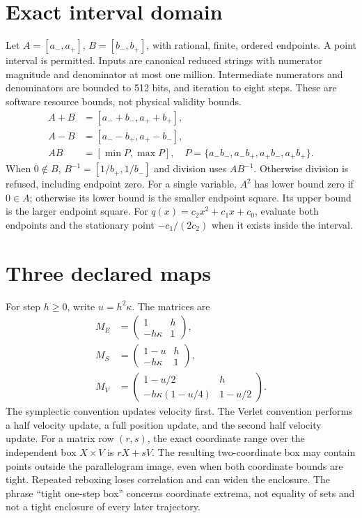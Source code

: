\documentclass[11pt]{article}
\begin{document}
\section{Exact interval domain}
Let \(A=[a_-,a_+]\), \(B=[b_-,b_+]\), with rational, finite, ordered
endpoints. A point interval is permitted. Inputs are canonical reduced strings
with numerator magnitude and denominator at most one million. Intermediate
numerators and denominators are bounded to 512 bits, and iteration to eight
steps. These are software resource bounds, not physical validity bounds.
\begin{align}
 A+B&=[a_-+b_-,a_++b_+],\\
 A-B&=[a_--b_+,a_+-b_-],\\
 AB&=[\min P,\max P],\quad
 P=\{a_-b_-,a_-b_+,a_+b_-,a_+b_+\}.
\end{align}
When \(0\notin B\), \(B^{-1}=[1/b_+,1/b_-]\) and division uses
\(AB^{-1}\). Otherwise division is refused, including endpoint zero.
For a single variable, \(A^2\) has lower bound zero if \(0\in A\); otherwise
its lower bound is the smaller endpoint square. Its upper bound is the larger
endpoint square. For \(q(x)=c_2x^2+c_1x+c_0\), evaluate both endpoints and
the stationary point \(-c_1/(2c_2)\) when it exists inside the interval.

\section{Three declared maps}
For step \(h\ge0\), write \(u=h^2\kappa\). The matrices are
\begin{align}
 M_E&=\begin{pmatrix}1&h\\-h\kappa&1\end{pmatrix},\\
 M_S&=\begin{pmatrix}1-u&h\\-h\kappa&1\end{pmatrix},\\
 M_V&=\begin{pmatrix}1-u/2&h\\-h\kappa(1-u/4)&1-u/2\end{pmatrix}.
\end{align}
The symplectic convention updates velocity first. The Verlet convention
performs a half velocity update, a full position update, and the second half
velocity update. For a matrix row \((r,s)\), the exact coordinate range over
the independent box \(X\times V\) is \(rX+sV\). The resulting two-coordinate
box may contain points outside the parallelogram image, even when both
coordinate bounds are tight. Repeated reboxing loses correlation and can widen
the enclosure. The phrase ``tight one-step box'' concerns coordinate extrema,
not equality of sets and not a tight enclosure of every later trajectory.
\end{document}
